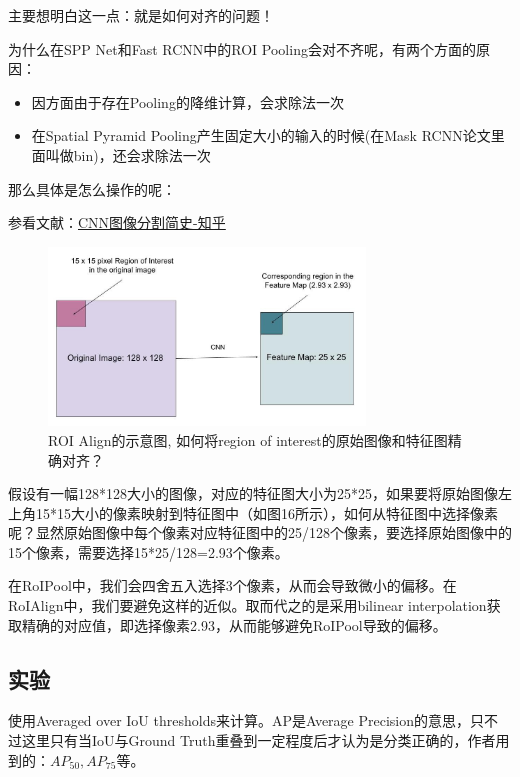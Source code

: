 主要想明白这一点：就是如何对齐的问题！

为什么在SPP Net和Fast RCNN中的ROI Pooling会对不齐呢，有两个方面的原因：
\begin{itemize}
\item 因方面由于存在Pooling的降维计算，会求除法一次
\item 在Spatial Pyramid Pooling产生固定大小的输入的时候(在Mask RCNN论文里面叫做bin)，还会求除法一次
\end{itemize}

那么具体是怎么操作的呢：

参看文献：\href{https://zhuanlan.zhihu.com/p/26652657}{CNN图像分割简史-知乎}

\begin{figure}[!hbtp]
\centering
\includegraphics[width=0.75\textwidth]{SemanticSLAM/MaskRCNN1_ROIAlign0.jpg}
\caption{ROI Align的示意图, 如何将region of interest的原始图像和特征图精确对齐？}
\label{MaskRCNN1_ROIAlign0}
\end{figure}

假设有一幅128*128大小的图像，对应的特征图大小为25*25，如果要将原始图像左上角15*15大小的像素映射到特征图中（如图16所示），如何从特征图中选择像素呢？显然原始图像中每个像素对应特征图中的25/128个像素，要选择原始图像中的15个像素，需要选择15*25/128=2.93个像素。

在RoIPool中，我们会四舍五入选择3个像素，从而会导致微小的偏移。在RoIAlign中，我们要避免这样的近似。取而代之的是采用bilinear interpolation获取精确的对应值，即选择像素2.93，从而能够避免RoIPool导致的偏移。

\subsection{实验}

使用Averaged over IoU thresholds来计算。AP是Average Precision的意思，只不过这里只有当IoU与Ground Truth重叠到一定程度后才认为是分类正确的，作者用到的：$AP_{50}, AP_{75}$等。

